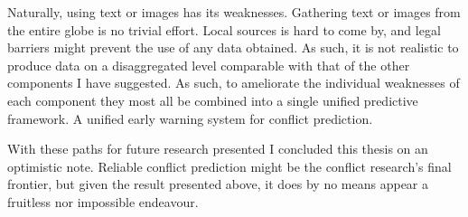 \documentclass[a4paper]{article}
\begin{document}
Naturally, using text or images has its weaknesses. Gathering text or images from the entire globe is no trivial effort. Local sources is hard to come by, and legal barriers might prevent the use of any data obtained. As such, it is not realistic to produce data on a disaggregated level comparable with that of the other components I have suggested. As such, to ameliorate the individual weaknesses of each component they most all be combined into a single unified predictive framework. A unified early warning system for conflict prediction.\par

With these paths for future research presented I concluded this thesis on an optimistic note. Reliable conflict prediction might be the conflict research's final frontier, but given the result presented above, it does by no means appear a fruitless nor impossible endeavour.\par




















\end{document}
